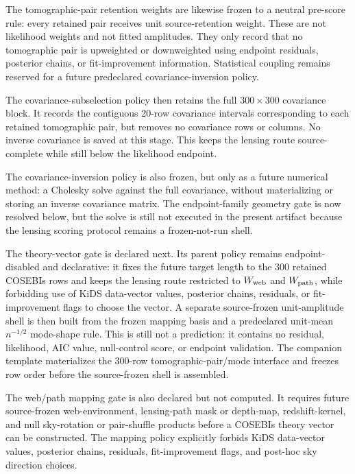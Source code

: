 \documentclass[11pt]{article}
\begin{document}
The tomographic-pair retention weights are likewise frozen to a neutral
pre-score rule: every retained pair receives unit source-retention weight. These
are not likelihood weights and not fitted amplitudes. They only record that no
tomographic pair is upweighted or downweighted using endpoint residuals,
posterior chains, or fit-improvement information. Statistical coupling remains
reserved for a future predeclared covariance-inversion policy.

The covariance-subselection policy then retains the full \(300\times300\)
covariance block. It records the contiguous 20-row covariance intervals
corresponding to each retained tomographic pair, but removes no covariance rows
or columns. No inverse covariance is saved at this stage. This keeps the lensing
route source-complete while still below the likelihood endpoint.

The covariance-inversion policy is also frozen, but only as a future numerical
method: a Cholesky solve against the full covariance, without materializing or
storing an inverse covariance matrix. The endpoint-family geometry gate is now
resolved below, but the solve is still not executed in the present artifact
because the lensing scoring protocol remains a frozen-not-run shell.

The theory-vector gate is declared next. Its parent policy remains
endpoint-disabled and declarative: it fixes the future target length to the 300
retained COSEBIs rows and keeps the lensing route restricted to \(W_{\rm web}\)
and \(W_{\rm path}\), while forbidding use of KiDS data-vector values, posterior
chains, residuals, or fit-improvement flags to choose the vector. A separate
source-frozen unit-amplitude shell is then built from the frozen mapping basis
and a predeclared unit-mean \(n^{-1/2}\) mode-shape rule. This is still not a
prediction: it contains no residual, likelihood, AIC value, null-control score,
or endpoint validation.
The companion template materializes the 300-row tomographic-pair/mode interface
and freezes row order before the source-frozen shell is assembled.

The web/path mapping gate is also declared but not computed. It requires future
source-frozen web-environment, lensing-path mask or depth-map, redshift-kernel,
and null sky-rotation or pair-shuffle products before a COSEBIs theory vector
can be constructed. The mapping policy explicitly forbids KiDS data-vector
values, posterior chains, residuals, fit-improvement flags, and post-hoc sky
direction choices.
\end{document}
